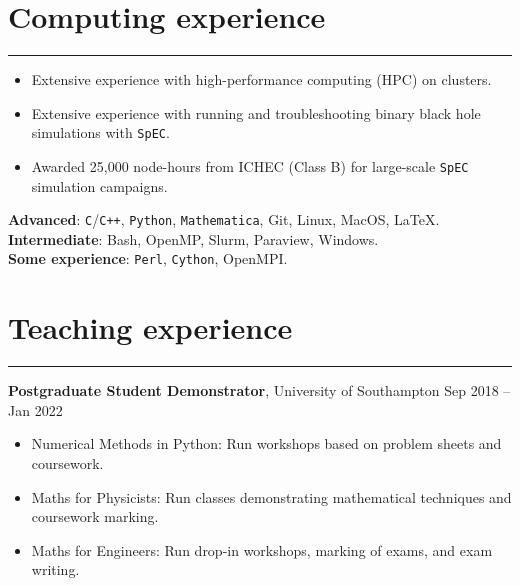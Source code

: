 \documentclass[10.5pt, oneside]{article}   	%
\begin{document}

\newpage
 {\color{Sectioncolour}
\section*{Computing experience}
\vspace{-3mm}
\noindent\rule{\linewidth}{0.6pt}}

\begin{itemize}
\item Extensive experience with high-performance computing (HPC) on clusters.
\item Extensive experience with running and troubleshooting binary black hole simulations with \texttt{SpEC}.
\item Awarded 25,000 node-hours from ICHEC (Class B) for large-scale \texttt{SpEC} simulation campaigns.
\end{itemize}

\textbf{Advanced}: \texttt{C}/\texttt{C++}, \texttt{Python}, \texttt{Mathematica}, Git, Linux, MacOS, \LaTeX. \vspace{1.5mm} \\ 
\textbf{Intermediate}: Bash, OpenMP, Slurm, Paraview, Windows. \vspace{1.5mm}\\
\textbf{Some experience}: \texttt{Perl}, \texttt{Cython}, OpenMPI.


{\color{Sectioncolour}
\section*{Teaching experience}
\vspace{-3mm}
\noindent\rule{\linewidth}{0.6pt}}

\textbf{Postgraduate Student Demonstrator}, University of Southampton \hfill Sep 2018 -- Jan 2022\\ \vspace{-5mm}
\begin{itemize}
\item Numerical Methods in Python: Run workshops based on problem sheets and coursework.
\item Maths for Physicists: Run classes demonstrating mathematical techniques and coursework marking.
\item Maths for Engineers: Run drop-in workshops, marking of exams, and exam writing.
\end{itemize}
\end{document}

